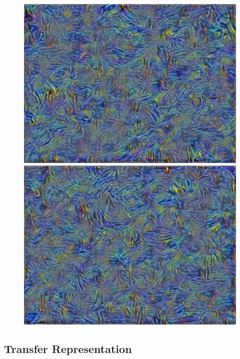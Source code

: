 \documentclass{article}
\begin{document}
\begin{figure}[htp]
    \begin{minipage}{0.3\linewidth}
    \includegraphics[width=\textwidth]{img/style/block4_conv1}
    \end{minipage}
    \begin{minipage}{0.3\linewidth}
    \includegraphics[width=\textwidth]{img/style/block5_conv1}
    \end{minipage}

\end{figure}



\subsection{Transfer Representation}
\end{document}
